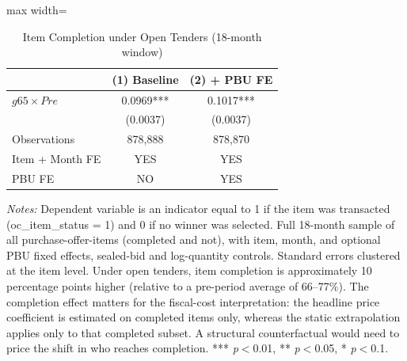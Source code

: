 \begin{table}[htbp]
\centering
\caption{Item Completion under Open Tenders (18-month window)}
\label{tab:completion}
\begin{adjustbox}{max width=\textwidth}
\begin{threeparttable}
\small
\begin{tabular}{lcc}
\toprule
 & (1) Baseline & (2) + PBU FE \\
\midrule
$g65 \times Pre$ & 0.0969*** & 0.1017*** \\
 & (0.0037) & (0.0037) \\
\midrule
Observations & 878,888 & 878,870 \\
Item + Month FE & YES & YES \\
PBU FE & NO & YES \\
\bottomrule
\end{tabular}
\begin{tablenotes}
\small
\item \textit{Notes:} Dependent variable is an indicator equal to 1 if the
item was transacted (oc\_item\_status = 1) and 0 if no winner was selected.
Full 18-month sample of all purchase-offer-items (completed and not),
with item, month, and optional PBU fixed effects, sealed-bid and
log-quantity controls. Standard errors clustered at the item level.
Under open tenders, item completion is approximately 10 percentage
points higher (relative to a pre-period average of 66--77\%). The
completion effect matters for the fiscal-cost interpretation: the
headline price coefficient is estimated on completed items only,
whereas the static extrapolation applies only to that completed
subset. A structural counterfactual would need to price the shift in
who reaches completion.
*** \textit{p}$<$0.01, ** \textit{p}$<$0.05, * \textit{p}$<$0.1.
\end{tablenotes}
\end{threeparttable}
\end{adjustbox}
\end{table}
